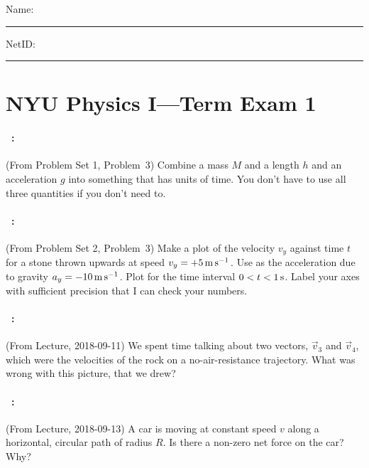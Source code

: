 \documentclass[12pt]{article}
\begin{document}
\noindent
Name: \rule[-1ex]{0.55\textwidth}{0.1pt}
NetID: \rule[-1ex]{0.2\textwidth}{0.1pt}

\section*{NYU Physics I---Term Exam 1}

\paragraph{\problemname~\theproblem:}%
(From Problem Set 1, Problem~3)
Combine a mass $M$ and a length $h$ and an acceleration $g$ into
something that has units of time. You don't have to use all three
quantities if you don't need to.

\vfill

\paragraph{\problemname~\theproblem:}%
(From Problem Set 2, Problem~3)
Make a plot of the velocity $v_y$ against time $t$ for a stone thrown upwards
at speed $v_y = +5\,\mathrm{m}\,\mathrm{s}^{-1}$. Use as the acceleration due to gravity $a_y = -10\,\mathrm{m}\,\mathrm{s}^{-1}$.
Plot for the time interval $0<t<1\,\mathrm{s}$.
Label your axes with sufficient precision that I can check your numbers.

\vfill

\paragraph{\problemname~\theproblem:}%
(From Lecture, 2018-09-11)
We spent time talking about two vectors, $\vec{v}_3$ and $\vec{v}_4$,
which were the velocities of the rock on a no-air-resistance trajectory.
What was wrong with this picture, that we drew?

\vfill

\clearpage
\paragraph{\problemname~\theproblem:}%
(From Lecture, 2018-09-13)
A car is moving at constant speed $v$ along a horizontal, circular path
of radius $R$. Is there a non-zero net force on the car? Why?
\end{document}
